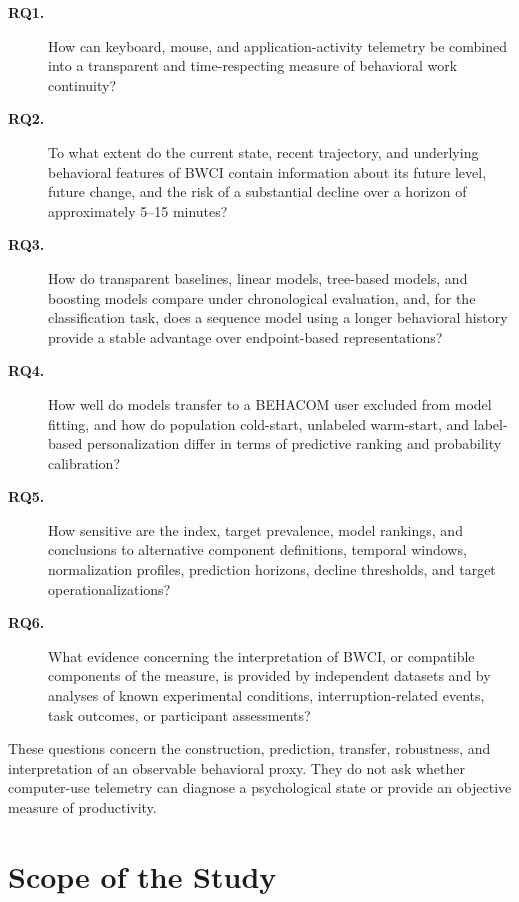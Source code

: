 \begin{description}

  \item[\textbf{RQ1.}]
  How can keyboard, mouse, and application-activity telemetry be combined into a transparent and time-respecting measure of behavioral work continuity?
  
  \item[\textbf{RQ2.}]
  To what extent do the current state, recent trajectory, and underlying behavioral features of BWCI contain information about its future level, future change, and the risk of a substantial decline over a horizon of approximately 5--15 minutes?

  \item[\textbf{RQ3.}]
  How do transparent baselines, linear models, tree-based models, and boosting models compare under chronological evaluation, and, for the classification task, does a sequence model using a longer behavioral history provide a stable advantage over endpoint-based representations?
  
  \item[\textbf{RQ4.}]
  How well do models transfer to a BEHACOM user excluded from model fitting, and how do population cold-start, unlabeled warm-start, and label-based personalization differ in terms of predictive ranking and probability calibration?

  \item[\textbf{RQ5.}]
  How sensitive are the index, target prevalence, model rankings, and conclusions to alternative component definitions, temporal windows, normalization profiles, prediction horizons, decline thresholds, and target operationalizations?

  \item[\textbf{RQ6.}]
  What evidence concerning the interpretation of BWCI, or compatible components of the measure, is provided by independent datasets and by analyses of known experimental conditions, interruption-related events, task outcomes, or participant assessments?

\end{description}

These questions concern the construction, prediction, transfer, robustness, and interpretation of an observable behavioral proxy. They do not ask whether computer-use telemetry can diagnose a psychological state or provide an objective measure of productivity. 

\section{Scope of the Study}

